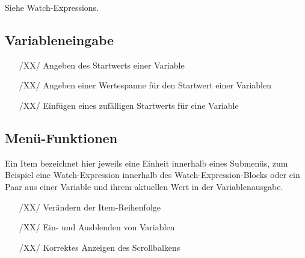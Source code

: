 \documentclass[parskip=full]{scrartcl}
\begin{document}
Siehe Watch-Expressions.


\subsection{Variableneingabe}



\begin{itemize}

\item[/XX/] Angeben des Startwerts einer Variable
\item[/XX/] Angeben einer Wertespanne für den Startwert einer Variablen
\item[/XX/] Einfügen eines zufälligen Startwerts für eine Variable
\end{itemize}

\subsection{Menü-Funktionen}

Ein Item bezeichnet hier jeweils eine Einheit innerhalb eines Submenüs, zum Beispiel eine Watch-Expression innerhalb des Watch-Expression-Blocks oder ein Paar aus einer Variable und ihrem aktuellen Wert in der Variablenausgabe.

\begin{itemize}

	\item[/XX/] Verändern der Item-Reihenfolge
	\item[/XX/] Ein- und Ausblenden von Variablen
	\item[/XX/] Korrektes Anzeigen des Scrollbalkens
\end{itemize}


\newpage
\end{document}
